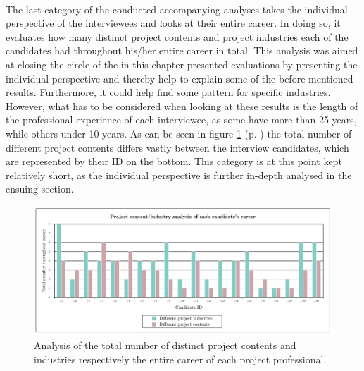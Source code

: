 
\\[.1cm]
The last category of the conducted accompanying analyses takes the individual perspective of the interviewees and looks at their entire career. In doing so, it evaluates how many distinct project contents and project industries each of the candidates had throughout his/her entire career in total. This analysis was aimed at closing the circle of the in this chapter presented evaluations by presenting the individual perspective and thereby help to explain some of the before-mentioned results. Furthermore, it could help find some pattern for specific industries. However, what has to be considered when looking at these results is the length of the professional experience of each interviewee, as some have more than 25 years, while others under 10 years. As can be seen in figure \ref{fig:analy_cand1} (p. \pageref{fig:analy_cand1}) the total number of different project contents differs vastly between the interview candidates, which are represented by their ID on the bottom. This category is at this point kept relatively short, as the individual perspective is further in-depth analysed in the ensuing section.  \\


\begin{figure}[!hbt]
    \captionsetup{font=small}
  \centering
  \includegraphics[width=1.0\columnwidth]{figures/Analysis_cand1.png}
  \caption[Analysis of distinct project contents and industries respectively the PP's career]{Analysis of the total number of distinct project contents and industries respectively the entire career of each project professional.}
  \label{fig:analy_cand1}
\end{figure}















